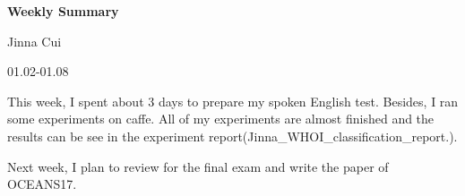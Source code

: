 \documentclass{article}
\begin{document}


\pagestyle{fancy}
\begin{center}
\textbf{\LARGE{Weekly Summary}} %
\end{center}

\begin{center}
Jinna Cui
\end{center}

\begin{center}
01.02-01.08
\end{center}
This week, I spent about 3 days to prepare my spoken English test. Besides, I ran some experiments on caffe. All of my experiments are almost finished and the results can be see in the experiment report(Jinna\_WHOI\_classification\_report.). 

Next week, I plan to review for the final exam and write the paper of OCEANS17. 
 
\end{document}
